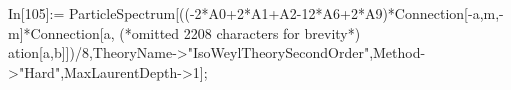In[105]:= ParticleSpectrum[((-2*A0+2*A1+A2-12*A6+2*A9)*Connection[-a,m,-m]*Connection[a, (*omitted 2208 characters for brevity*) ation[a,b]])/8,TheoryName->"IsoWeylTheorySecondOrder",Method->"Hard",MaxLaurentDepth->1];